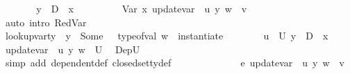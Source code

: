 \begin{isabellebody}
\ \ \ \ \isamarkupfalse%
\ \isamarkupfalse%
\ {\isachardoublequoteopen}y\ {\isasymnotin}\ {\isacharparenleft}{\kern0pt}D\ {\isasymunion}\ {\isacharbraceleft}{\kern0pt}x{\isacharbraceright}{\kern0pt}{\isacharparenright}{\kern0pt}{\isachardoublequoteclose}\isanewline
\ \ \ \ \isamarkupfalse%
\ \isamarkupfalse%
\ {\isachardoublequoteopen}{\isasymLambda}{\isacharcomma}{\kern0pt}{\isasymGamma}{\isacharcomma}{\kern0pt}{\isasymOmega}\ {\isasymturnstile}\ {\isasymlangle}Var\ x{\isacharcomma}{\kern0pt}\ {\isacharparenleft}{\kern0pt}update{\isacharunderscore}{\kern0pt}var\ {\isasymLambda}\ u{\isacharprime}{\kern0pt}\ y\ w{\isacharparenright}{\kern0pt}{\isasymrangle}\ {\isasymDown}\ v{\isachardoublequoteclose}\ \ \ \ \ \ \isanewline
\ \ \ \ \ \ \isamarkupfalse%
\ {\isacharparenleft}{\kern0pt}auto\ intro{\isacharcolon}{\kern0pt}\ RedVar{\isacharparenright}{\kern0pt}\ \ \isanewline
\ \ \ \ \isamarkupfalse%
\ {\isacartoucheopen}lookup{\isacharunderscore}{\kern0pt}var{\isacharunderscore}{\kern0pt}ty\ {\isasymLambda}\ y\ {\isacharequal}{\kern0pt}\ Some\ {\isasymtau}{\isacartoucheclose}\ \ {\isacartoucheopen}type{\isacharunderscore}{\kern0pt}of{\isacharunderscore}{\kern0pt}val\ w\ {\isacharequal}{\kern0pt}\ instantiate\ {\isasymOmega}\ {\isasymtau}{\isacartoucheclose}\isanewline
\ \ \ \ \isamarkupfalse%
\ {\isacartoucheopen}u{\isacharprime}{\kern0pt}\ {\isasymin}\ U{\isacartoucheclose}\ {\isacartoucheopen}y\ {\isasymnotin}\ {\isacharparenleft}{\kern0pt}D\ {\isasymunion}\ {\isacharbraceleft}{\kern0pt}x{\isacharbraceright}{\kern0pt}{\isacharparenright}{\kern0pt}{\isacartoucheclose}\ \isamarkupfalse%
\ {\isachardoublequoteopen}{\isacharparenleft}{\kern0pt}update{\isacharunderscore}{\kern0pt}var\ {\isasymLambda}\ u{\isacharprime}{\kern0pt}\ y\ w{\isacharparenright}{\kern0pt}\ {\isasymin}\ U{\isachardoublequoteclose}\ \isamarkupfalse%
\ DepU\isanewline
\ \ \ \ \ \ \isamarkupfalse%
\ {\isacharparenleft}{\kern0pt}simp\ add{\isacharcolon}{\kern0pt}\ dependent{\isacharunderscore}{\kern0pt}def\ closed{\isacharunderscore}{\kern0pt}set{\isacharunderscore}{\kern0pt}ty{\isacharunderscore}{\kern0pt}def{\isacharparenright}{\kern0pt}\ \ \ \ \ \ \isanewline
\ \ \ \ \isamarkupfalse%
\ {\isachardoublequoteopen}{\isasymLambda}{\isacharcomma}{\kern0pt}{\isasymGamma}{\isacharcomma}{\kern0pt}{\isasymOmega}\ {\isasymturnstile}\ {\isasymlangle}e{}{\isacharcomma}{\kern0pt}\ update{\isacharunderscore}{\kern0pt}var\ {\isasymLambda}\ u{\isacharprime}{\kern0pt}\ y\ w{\isasymrangle}\ {\isasymDown}\ v{\isachardoublequoteclose}\ \isamarkupfalse%

\end{isabellebody}
